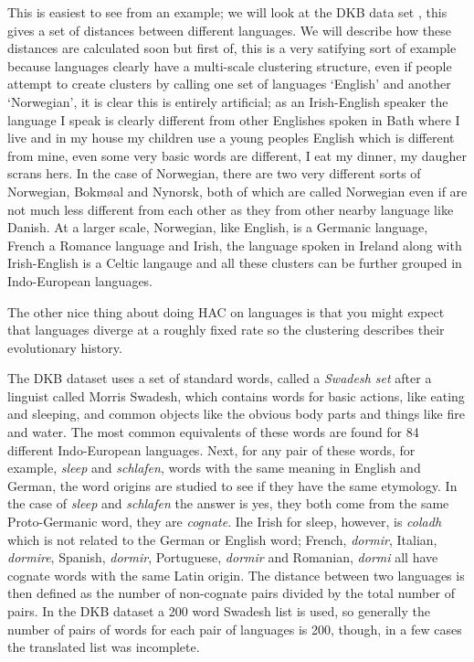\documentclass[12pt]{article}
\begin{document}
This is easiest to see from an example; we will look at the DKB data
set \cite{DyanKruskalBlack1992}, this gives a set of distances between different languages. We
will describe how these distances are calculated soon but first of,
this is a very satifying sort of example because languages clearly
have a multi-scale clustering structure, even if people attempt to
create clusters by calling one set of languages `English' and another
`Norwegian', it is clear this is entirely artificial; as an
Irish-English speaker the language I speak is clearly different from
other Englishes spoken in Bath where I live and in my house my
children use a young peoples English which is different from mine,
even some very basic words are different, I eat my dinner, my daugher
scrans hers. In the case of Norwegian, there are two very different
sorts of Norwegian, Bokm\o{a}l and Nynorsk, both of which are called
Norwegian even if are not much less different from each other as they
from other nearby language like Danish. At a larger scale, Norwegian,
like English, is a Germanic language, French a Romance language and
Irish, the language spoken in Ireland along with Irish-English is a
Celtic langauge and all these clusters can be further grouped in
Indo-European languages.

The other nice thing about doing HAC on languages is that you might
expect that languages diverge at a roughly fixed rate so the
clustering describes their evolutionary history.

The DKB dataset uses a set of standard words, called a \textsl{Swadesh
  set} after a linguist called Morris Swadesh, which contains words
for basic actions, like eating and sleeping, and common objects like
the obvious body parts and things like fire and water. The most common
equivalents of these words are found for 84 different Indo-European
languages. Next, for any pair of these words, for example,
\textsl{sleep} and \textsl{schlafen}, words with the same meaning in
English and German, the word origins are studied to see if they have
the same etymology. In the case of \textsl{sleep} and
\textsl{schlafen} the answer is yes, they both come from the same
Proto-Germanic word, they are \textsl{cognate}. Ihe Irish for sleep,
however, is \textsl{coladh} which is not related to the German or
English word; French, \textsl{dormir}, Italian, \textsl{dormire},
Spanish, \textsl{dormir}, Portuguese, \textsl{dormir} and Romanian,
\textsl{dormi} all have cognate words with the same Latin origin. The
distance between two languages is then defined as the number of
non-cognate pairs divided by the total number of pairs. In the DKB
dataset a 200 word Swadesh list is used, so generally the number of
pairs of words for each pair of languages is 200, though, in a few
cases the translated list was incomplete.
\end{document}
